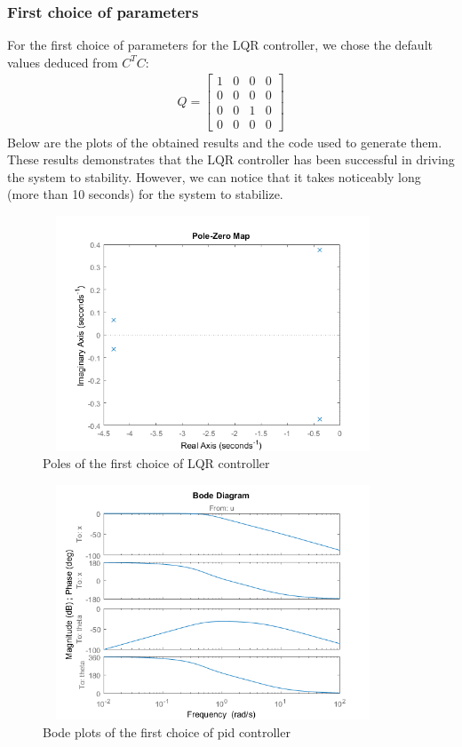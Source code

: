 \documentclass [12pt,letterpaper]{exam}
\begin{document}
\subsubsection{First choice of parameters}
For the first choice of parameters for the LQR controller, we chose the default values deduced from $C^TC$:
\begin{align}
Q = \begin{bmatrix}
1 & 0 & 0 & 0 \\
0 & 0 & 0 & 0 \\
0 & 0 & 1 & 0 \\
0 & 0 & 0 & 0
\end{bmatrix}
\end{align}
Below are the plots of the obtained results and the code used to generate them. These results demonstrates that the LQR controller has been successful in driving the system to stability. However, we can notice that it takes noticeably long (more than 10 seconds) for the system to stabilize.

\begin{figure}[H]
  \centering
    \includegraphics[width=10.15cm, height=7cm]{lqr_poles} 
  \caption{Poles of the first choice of LQR controller}
  \label{fig:lqr_poles}
\end{figure}

\begin{figure}[H]
  \centering
    \includegraphics[width=10.15cm, height=7cm]{lqr_bode} 
  \caption{Bode plots of the first choice of pid controller}
  \label{fig:lqr_bode}
\end{figure}
\end{document}
